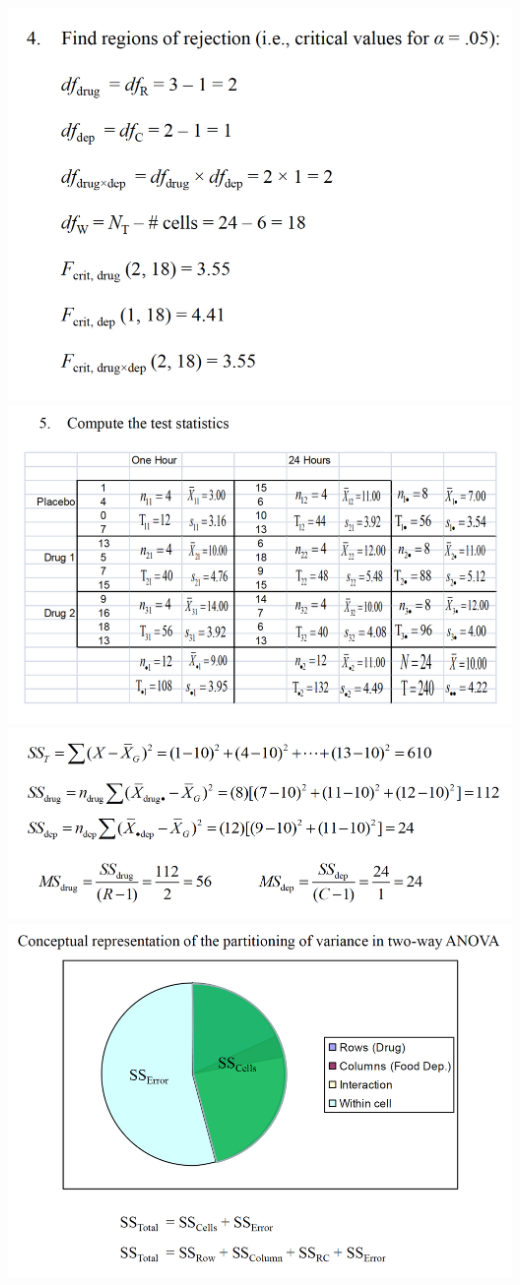 \documentclass[]{book}
\theoremstyle{definition}
\theoremstyle{definition}
\theoremstyle{definition}
\theoremstyle{remark}
\begin{document}
\includegraphics{img/hicksfa10.png} \includegraphics{img/hicksfa11.png}
\includegraphics{img/hicksfa12.png} \includegraphics{img/hicksfa13.png}
\end{document}
